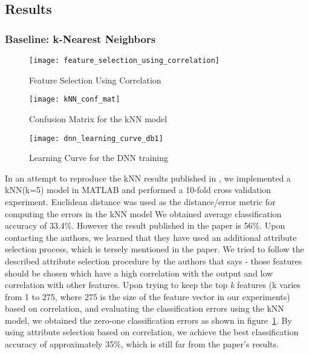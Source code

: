 \subsection{Results}

\subsubsection{Baseline: k-Nearest Neighbors}

\begin{figure}[!htb] 
\centering 
\texttt{[image: feature\_selection\_using\_correlation]} 
\caption[Feature Selection]{Feature Selection Using Correlation}
\label{fig:feature_selection_using_correlation} 
\end{figure}


\begin{figure}[!htb] 
\centering 
\texttt{[image: kNN\_conf\_mat]} 
\caption[kNN Confusion Matrix]{Confusion Matrix for the kNN model}
\label{fig:kNN_conf_mat} 
\end{figure}

\begin{figure}[!htb] 
\centering 
\texttt{[image: dnn\_learning\_curve\_db1]} 
\caption[DNN Learning Curve]{Learning Curve for the DNN training}
\label{fig:dnn_learning_curve_db1} 
\end{figure}

In an attempt to reproduce the kNN results published in \cite{salamon2014dataset}, we implemented a kNN(k=5) model in MATLAB and performed a 10-fold cross validation experiment. Euclidean distance was used as the distance/error metric for computing the errors in the kNN model We obtained average classification accuracy of 33.4\%. However the result published in the paper is 56\%. Upon contacting the authors, we learned that they have used an additional attribute selection process, which is tersely mentioned in the paper. We tried to follow the described attribute selection procedure by the authors that says - those features should be chosen which have a high correlation with the output and low correlation with other features. Upon trying to keep the top \textsl{k} features (k varies from 1 to 275, where 275 is the size of the feature vector in our experiments) based on correlation, and evaluating the classification errors using the kNN model, we obtained the zero-one classification errors as shown in figure~\ref{fig:feature_selection_using_correlation}. By using attribute selection based on correlation, we achieve the best classification accuracy of approximately 35\%, which is still far from the paper's results. 

